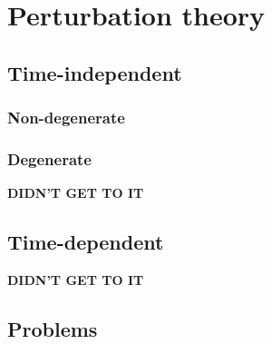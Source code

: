 \section{Perturbation theory}    
	\subsection{Time-independent}
		\subsubsection{Non-degenerate}
		\subsubsection{Degenerate}		
			\textbf{DIDN'T GET TO IT}
	\subsection{Time-dependent}
		\textbf{DIDN'T GET TO IT}
	\subsection{Problems}